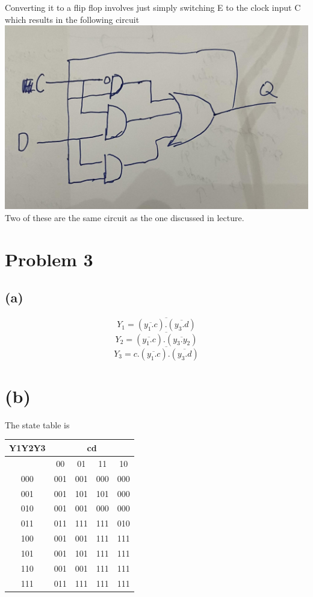 \documentclass[12pt]{article}
\begin{document}
Converting it to a flip flop involves just simply switching
E to the clock input C which results in the following circuit\\
\includegraphics[scale=0.25]{Fig5.jpg}\\

Two of these are the same circuit as the one discussed in lecture.
\section*{Problem 3}
\subsection*{(a)}
$$Y_1=\overline{(\overline{y_1.c}).(\overline{y_3.d})}$$
$$Y_2=\overline{(\overline{y_1.c}).(\overline{y_3.y_2})}$$
$$Y_3=\overline{c.(\overline{y_1.c}).(\overline{y_3.d})}$$
\section*{(b)}
The state table is 
\begin{center}
    \begin{tabular}{|c|c|c|c|c|}
        Y1Y2Y3 & \multicolumn{4}{c}{cd} \\
        \hline
        & 00 & 01 & 11 & 10 \\
        \hline
        000 & 001& 001& 000& 000\\
\hline
001 & 001& 101& 101& 000\\
\hline
010 & 001& 001& 000& 000\\
\hline
011 & 011& 111& 111& 010\\
\hline
100 & 001& 001& 111& 111\\
\hline
101 & 001& 101& 111& 111\\
\hline
110 & 001& 001& 111& 111\\
\hline
111 & 011& 111& 111& 111\\
\hline
    \end{tabular}
\end{center}
\end{document}
